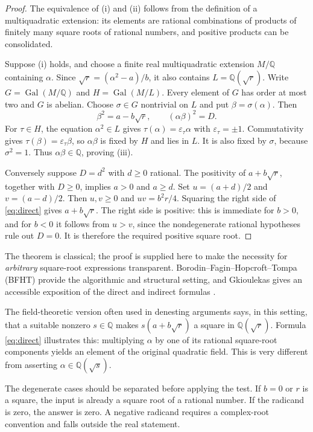 \documentclass[11pt,letterpaper]{article}
\numberwithin{equation}{section}
\theoremstyle{definition}
\theoremstyle{remark}
\newcommand{\Q}{\mathbb{Q}}
\newcommand{\Gal}{\operatorname{Gal}}
\begin{document}
\begin{proof}
The equivalence of (i) and (ii) follows from the definition of a multiquadratic extension: its elements are rational combinations of products of finitely many square roots of rational numbers, and positive products can be consolidated.

Suppose (i) holds, and choose a finite real multiquadratic extension $M/\Q$ containing $\alpha$. Since $\sqrt r=(\alpha^2-a)/b$, it also contains $L=\Q(\sqrt r)$. Write $G=\Gal(M/\Q)$ and $H=\Gal(M/L)$. Every element of $G$ has order at most two and $G$ is abelian. Choose $\sigma\in G$ nontrivial on $L$ and put $\beta=\sigma(\alpha)$. Then
\[
\beta^2=a-b\sqrt r,
\qquad (\alpha\beta)^2=D.
\]
For $\tau\in H$, the equation $\alpha^2\in L$ gives $\tau(\alpha)=\varepsilon_\tau\alpha$ with $\varepsilon_\tau=\pm1$. Commutativity gives $\tau(\beta)=\varepsilon_\tau\beta$, so $\alpha\beta$ is fixed by $H$ and lies in $L$. It is also fixed by $\sigma$, because $\sigma^2=1$. Thus $\alpha\beta\in\Q$, proving (iii).

Conversely suppose $D=d^2$ with $d\ge0$ rational. The positivity of $a+b\sqrt r$, together with $D\ge0$, implies $a>0$ and $a\ge d$. Set $u=(a+d)/2$ and $v=(a-d)/2$. Then $u,v\ge0$ and $uv=b^2r/4$. Squaring the right side of \eqref{eq:direct} gives $a+b\sqrt r$. The right side is positive: this is immediate for $b>0$, and for $b<0$ it follows from $u>v$, since the nondegenerate rational hypotheses rule out $D=0$. It is therefore the required positive square root.
\end{proof}

The theorem is classical; the proof is supplied here to make the necessity for \emph{arbitrary} square-root expressions transparent. Borodin--Fagin--Hopcroft--Tompa (BFHT) provide the algorithmic and structural setting, and Gkioulekas gives an accessible exposition of the direct and indirect formulas \cite{bfht,gkioulekas}.

The field-theoretic version often used in denesting arguments says, in this setting, that a suitable nonzero $s\in\Q$ makes $s(a+b\sqrt r)$ a square in $\Q(\sqrt r)$. Formula \eqref{eq:direct} illustrates this: multiplying $\alpha$ by one of its rational square-root components yields an element of the original quadratic field. This is very different from asserting $\alpha\in\Q(\sqrt s)$.

The degenerate cases should be separated before applying the test. If $b=0$ or $r$ is a square, the input is already a square root of a rational number. If the radicand is zero, the answer is zero. A negative radicand requires a complex-root convention and falls outside the real statement.
\end{document}
